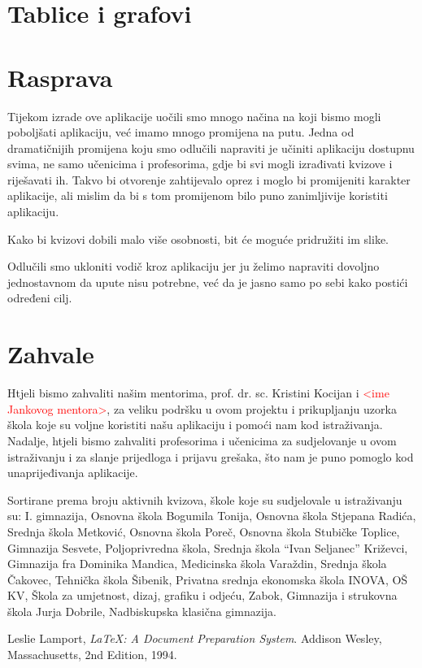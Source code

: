 \documentclass{scrreprt}
\begin{document}
\chapter{Tablice i grafovi}

\chapter{Rasprava}

Tijekom izrade ove aplikacije uočili smo mnogo načina na koji bismo mogli
poboljšati aplikaciju, već imamo mnogo promijena na putu. Jedna od dramatičnijih
promijena koju smo odlučili napraviti je učiniti aplikaciju dostupnu svima, ne
samo učenicima i profesorima, gdje bi svi mogli izrađivati kvizove i riješavati
ih. Takvo bi otvorenje zahtijevalo oprez i moglo bi promijeniti karakter
aplikacije, ali mislim da bi s tom promijenom bilo puno zanimljivije koristiti
aplikaciju.

Kako bi kvizovi dobili malo više osobnosti, bit će moguće pridružiti im slike.

Odlučili smo ukloniti vodič kroz aplikaciju jer ju želimo napraviti dovoljno
jednostavnom da upute nisu potrebne, već da je jasno samo po sebi kako postići
određeni cilj.

\chapter{Zahvale}

Htjeli bismo zahvaliti našim mentorima, prof. dr. sc. Kristini Kocijan i
\textcolor{red}{<ime Jankovog mentora>}, za veliku podršku u ovom projektu i
prikupljanju uzorka škola koje su voljne koristiti našu aplikaciju i pomoći nam
kod istraživanja. Nadalje, htjeli bismo zahvaliti profesorima i učenicima za
sudjelovanje u ovom istraživanju i za slanje prijedloga i prijavu grešaka, što
nam je puno pomoglo kod unaprijeđivanja aplikacije.

Sortirane prema broju aktivnih kvizova, škole koje su sudjelovale u istraživanju
su: I. gimnazija, Osnovna škola Bogumila Tonija, Osnovna škola Stjepana Radića,
Srednja škola Metković, Osnovna škola Poreč, Osnovna škola Stubičke Toplice,
Gimnazija Sesvete, Poljoprivredna škola, Srednja škola ``Ivan Seljanec''
Križevci, Gimnazija fra Dominika Mandica, Medicinska škola Varaždin, Srednja
škola Čakovec, Tehnička škola Šibenik, Privatna srednja ekonomska škola INOVA,
OŠ KV, Škola za umjetnost, dizaj, grafiku i odjeću, Zabok, Gimnazija i strukovna
škola Jurja Dobrile, Nadbiskupska klasična gimnazija.

\begin{thebibliography}{9}
   Leslie Lamport, \emph{\LaTeX: A Document Preparation
    System}. Addison Wesley, Massachusetts, 2nd Edition, 1994.
\end{thebibliography}
\end{document}
